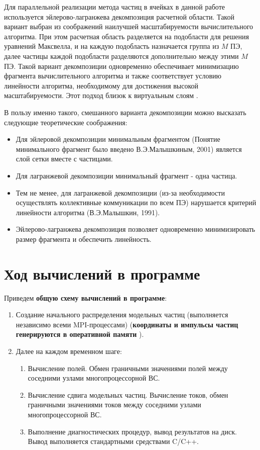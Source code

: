 Для параллельной реализации метода частиц в ячейках в данной работе используется эйлерово-лагранжева декомпозиция расчетной области. Такой вариант выбран из соображений наилучшей масштабируемости вычислительного алгоритма.
При этом расчетная область разделяется на подобласти для решения уравнений Максвелла, и на каждую подобласть назначается группа из $M$ ПЭ, далее частицы каждой подобласти разделяются дополнительно между этими $M$ ПЭ. Такой вариант декомпозиции одновременно обеспечивает минимизацию фрагмента вычислительного алгоритма и также соответствует условию линейности алгоритма, необходимому для достижения высокой масштабируемости. Этот подход близок к виртуальным слоям \cite{Kraeva2001}.

В пользу именно такого, смешанного варианта декомпозиции можно высказать следующие теоретические соображения:
\begin{itemize}
	\item Для эйлеровой декомпозиции минимальным фрагментом (Понятие минимального фрагмент было введено В.Э.Малышкиным, 2001) является слой сетки вместе с частицами.
	\item Для лагранжевой декомпозиции минимальный фрагмент - одна частица.
	\item Тем не менее, для лагранжевой декомпозиции (из-за необходимости осуществлять коллективные коммуникации по всем ПЭ) нарушается критерий линейности алгоритма (В.Э.Малышкин, 1991).
	\item Эйлерово-лагранжева декомпозиция позволяет одновременно минимизировать размер фрагмента и обеспечить линейность.
	
\end{itemize}








\clearpage

\section{Ход вычислений в программе}

Приведем \textbf{общую схему вычислений в программе}:
\begin{enumerate}
	\item Создание начального 
	распределения модельных частиц
	(выполняется независимо 
	всеми MPI-процессами) (\textbf{координаты и импульсы частиц генерируются в оперативной памяти} ). 
	\item Далее на каждом временном шаге:
	\begin{enumerate}
		\item Вычисление полей. Обмен граничными значениями полей между соседними узлами многопроцессорной ВС.
		\item Вычисление сдвига модельных частиц. Вычисление токов, обмен граничными значениями токов между соседними узлами многопроцессорной ВС.
		\item Выполнение диагностических процедур, вывод результатов на диск. Вывод выполняется стандартными средствами C/C++.
	\end{enumerate}	
\end{enumerate}

